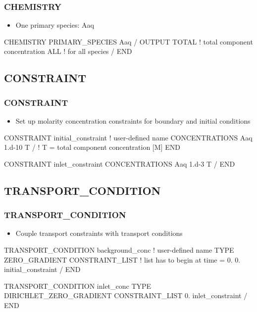 \documentclass{beamer}
\newcommand\redcomment[1]{{{\color{red} #1}}}
\newcommand\bluecomment[1]{{{\color{blue} #1}}}
\begin{document}
\begin{frame}[fragile]\frametitle{CHEMISTRY}

\begin{itemize}
  \item One primary species: Aaq
\end{itemize}

\begin{semiverbatim}
CHEMISTRY
  PRIMARY_SPECIES
    Aaq
  /
  OUTPUT
    TOTAL        \bluecomment{! total component concentration}
    ALL          \bluecomment{! for all species}
  /
END
\end{semiverbatim}

\end{frame}

\subsection{CONSTRAINT}

\begin{frame}[fragile]\frametitle{CONSTRAINT}

\begin{itemize}
  \item Set up molarity concentration constraints for boundary and initial conditions
\end{itemize}

\begin{semiverbatim}

CONSTRAINT initial_constraint \bluecomment{! user-defined name}
  CONCENTRATIONS
    Aaq   1.d-10   T
  /      \bluecomment{! T = total component concentration [M]}
END

CONSTRAINT inlet_constraint
  CONCENTRATIONS
    Aaq   1.d-3    T
  /
END

\end{semiverbatim}

\end{frame}

\subsection{TRANSPORT\_CONDITION}

\begin{frame}[fragile]\frametitle{TRANSPORT\_CONDITION}


\begin{itemize}
  \item Couple transport constraints with transport conditions
\end{itemize}
\begin{semiverbatim}
TRANSPORT_CONDITION background_conc \bluecomment{! user-defined name}
  TYPE ZERO_GRADIENT
  CONSTRAINT_LIST
    \bluecomment{! list has to begin at time = \redcomment{0.}}
    0. initial_constraint
  /
END

TRANSPORT_CONDITION inlet_conc
  TYPE DIRICHLET_ZERO_GRADIENT
  CONSTRAINT_LIST
    0. inlet_constraint
  /
END
\end{semiverbatim}

\end{frame}
\end{document}
